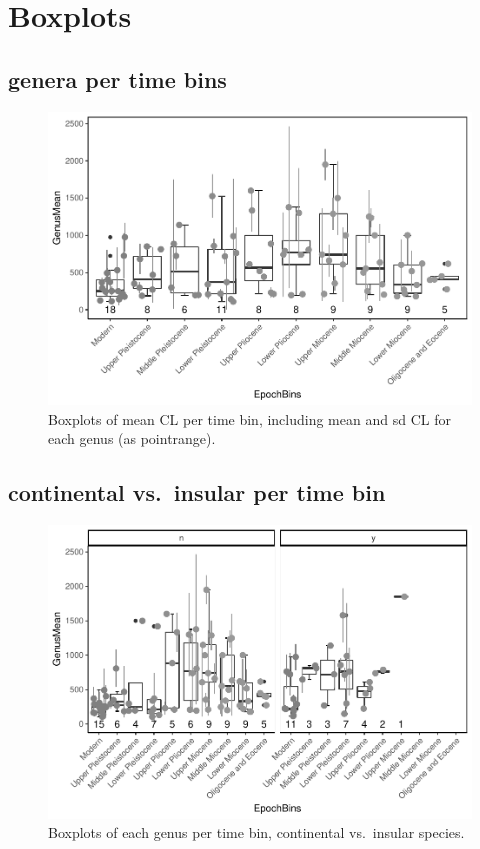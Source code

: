\documentclass[]{article}
\begin{document}
\section{Boxplots}\label{boxplots}

\subsection{genera per time bins}\label{genera-per-time-bins}

\begin{figure}[htbp]
\centering
\includegraphics{MA_JJ_files/figure-latex/Boxplots of each genus per time bin-1.pdf}
\caption{Boxplots of mean CL per time bin, including mean and sd CL for
each genus (as pointrange).}
\end{figure}

\newpage

\subsection{continental vs.~insular per time
bin}\label{continental-vs.insular-per-time-bin}

\begin{figure}[htbp]
\centering
\includegraphics{MA_JJ_files/figure-latex/Boxplots of each genus per time bin, continental vs. insular-1.pdf}
\caption{Boxplots of each genus per time bin, continental vs.~insular
species.}
\end{figure}
\end{document}
